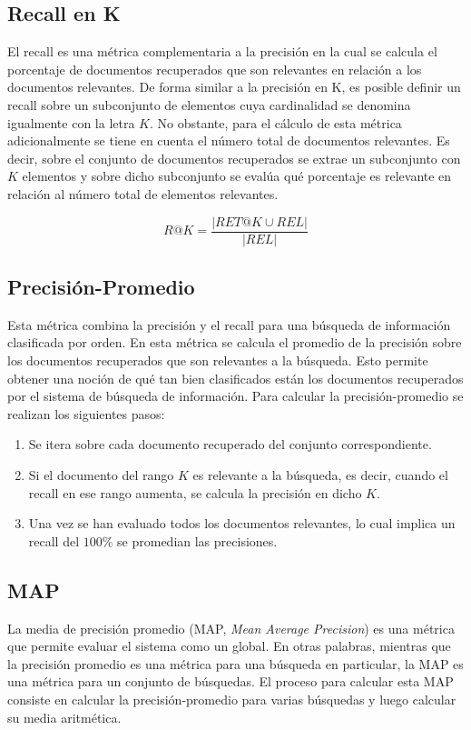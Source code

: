 \subsection{Recall en K}
El recall es una métrica complementaria a la precisión en la cual se calcula el porcentaje de documentos recuperados que son relevantes en relación a los documentos relevantes. De forma similar a la precisión en K, es posible definir un recall sobre un subconjunto de elementos cuya cardinalidad se denomina igualmente con la letra $K$. No obstante, para el cálculo de esta métrica adicionalmente se tiene en cuenta el número total de documentos relevantes. Es decir, sobre el conjunto de documentos recuperados se extrae un subconjunto con $K$ elementos y sobre dicho subconjunto se evalúa qué porcentaje es relevante en relación al número total de elementos relevantes.

\begin{equation}
    R@K = \frac{|RET@K \cup REL|}{|REL|}
    \label{eq:recallatk}
\end{equation}

\subsection{Precisión-Promedio}
Esta métrica combina la precisión y el recall para una búsqueda de información clasificada por orden. En esta métrica se calcula el promedio de la precisión sobre los documentos recuperados que son relevantes a la búsqueda. Esto permite obtener una noción de qué tan bien clasificados están los documentos recuperados por el sistema de búsqueda de información. Para calcular la precisión-promedio se realizan los siguientes pasos:

\begin{enumerate}
    \item Se itera sobre cada documento recuperado del conjunto correspondiente.
    \item Si el documento del rango $K$ es relevante a la búsqueda, es decir, cuando el recall en ese rango aumenta, se calcula la precisión en dicho $K$.
    \item Una vez se han evaluado todos los documentos relevantes, lo cual implica un recall del $100\%$ se promedian las precisiones.
\end{enumerate}

\subsection{MAP}
La media de precisión promedio (MAP, \textit{Mean Average Precision}) es una métrica que permite evaluar el sistema como un global. En otras palabras, mientras que la precisión promedio es una métrica para una búsqueda en particular, la MAP es una métrica para un conjunto de búsquedas. El proceso para calcular esta MAP consiste en calcular la precisión-promedio para varias búsquedas y luego calcular su media aritmética.

